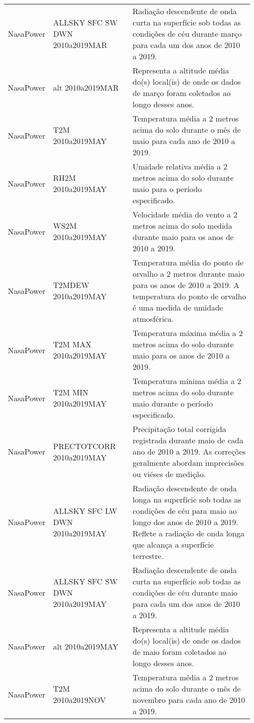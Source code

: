 \begin{longtable}{@{} p{4cm} p{4cm} p{8cm} @{}}
	NasaPower &
	ALLSKY SFC SW DWN 2010a2019MAR &
	Radiação descendente de onda curta na superfície sob todas as condições de céu durante março para cada um dos anos de 2010 a 2019. \\
	NasaPower &
	alt 2010a2019MAR &
	Representa a altitude média do(s) local(is) de onde os dados de março foram coletados ao longo desses anos. \\
	NasaPower &
	T2M 2010a2019MAY &
	Temperatura média a 2 metros acima do solo durante o mês de maio para cada ano de 2010 a 2019. \\
	NasaPower &
	RH2M 2010a2019MAY &
	Umidade relativa média a 2 metros acima do solo durante maio para o período especificado. \\
	NasaPower &
	WS2M 2010a2019MAY &
	Velocidade média do vento a 2 metros acima do solo medida durante maio para os anos de 2010 a 2019. \\
	NasaPower &
	T2MDEW 2010a2019MAY &
	Temperatura média do ponto de orvalho a 2 metros durante maio para os anos de 2010 a 2019. A temperatura do ponto de orvalho é uma medida de umidade atmosférica. \\
	NasaPower &
	T2M MAX 2010a2019MAY &
	Temperatura máxima média a 2 metros acima do solo durante maio para os anos de 2010 a 2019. \\
	NasaPower &
	T2M MIN 2010a2019MAY &
	Temperatura mínima média a 2 metros acima do solo durante maio durante o período especificado. \\
	NasaPower &
	PRECTOTCORR 2010a2019MAY &
	Precipitação total corrigida registrada durante maio de cada ano de 2010 a 2019. As correções geralmente abordam imprecisões ou viéses de medição. \\
	NasaPower &
	ALLSKY SFC LW DWN 2010a2019MAY &
	Radiação descendente de onda longa na superfície sob todas as condições de céu para maio ao longo dos anos de 2010 a 2019. Reflete a radiação de onda longa que alcança a superfície terrestre. \\
	NasaPower &
	ALLSKY SFC SW DWN 2010a2019MAY &
	Radiação descendente de onda curta na superfície sob todas as condições de céu durante maio para cada um dos anos de 2010 a 2019. \\
	NasaPower &
	alt 2010a2019MAY &
	Representa a altitude média do(s) local(is) de onde os dados de maio foram coletados ao longo desses anos. \\
	NasaPower &
	T2M 2010a2019NOV &
	Temperatura média a 2 metros acima do solo durante o mês de novembro para cada ano de 2010 a 2019. \\

\end{longtable}
